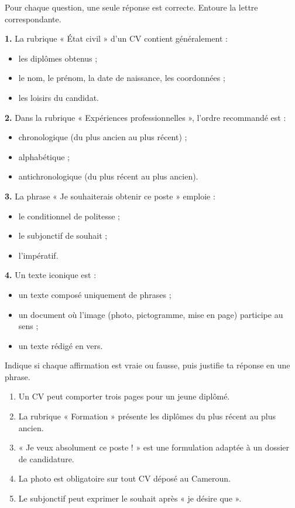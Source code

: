 \documentclass[11pt]{article}
\begin{document}
\begin{exercice}
Pour chaque question, une seule réponse est correcte. Entoure la lettre correspondante.

\textbf{1.} La rubrique « État civil » d'un CV contient généralement :
\begin{itemize}
\item[a)] les diplômes obtenus ;
\item[b)] le nom, le prénom, la date de naissance, les coordonnées ;
\item[c)] les loisirs du candidat.
\end{itemize}

\textbf{2.} Dans la rubrique « Expériences professionnelles », l'ordre recommandé est :
\begin{itemize}
\item[a)] chronologique (du plus ancien au plus récent) ;
\item[b)] alphabétique ;
\item[c)] antichronologique (du plus récent au plus ancien).
\end{itemize}

\textbf{3.} La phrase « Je souhaiterais obtenir ce poste » emploie :
\begin{itemize}
\item[a)] le conditionnel de politesse ;
\item[b)] le subjonctif de souhait ;
\item[c)] l'impératif.
\end{itemize}

\textbf{4.} Un texte iconique est :
\begin{itemize}
\item[a)] un texte composé uniquement de phrases ;
\item[b)] un document où l'image (photo, pictogramme, mise en page) participe au sens ;
\item[c)] un texte rédigé en vers.
\end{itemize}
\end{exercice}

\begin{exercice}
Indique si chaque affirmation est vraie ou fausse, puis justifie ta réponse en une phrase.

\begin{enumerate}
\item Un CV peut comporter trois pages pour un jeune diplômé.
\item La rubrique « Formation » présente les diplômes du plus récent au plus ancien.
\item « Je veux absolument ce poste ! » est une formulation adaptée à un dossier de candidature.
\item La photo est obligatoire sur tout CV déposé au Cameroun.
\item Le subjonctif peut exprimer le souhait après « je désire que ».
\end{enumerate}
\end{exercice}
\end{document}
